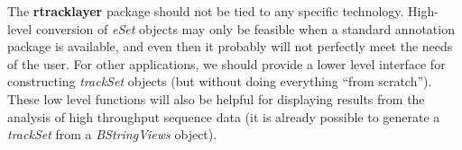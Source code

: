 \documentclass{article}
\begin{document}
The \textbf{rtracklayer} package should not be tied to any specific technology. High-level conversion of \textit{eSet} objects may only be feasible when a standard annotation package is available, and even then it probably will not perfectly meet the needs of the user. For other applications, we should provide a lower level interface for constructing \textit{trackSet} objects (but without doing everything ``from scratch''). These low level functions will also be helpful for displaying results from the analysis of high throughput sequence data (it is already possible to generate a \textit{trackSet} from a \textit{BStringViews} object).
\end{document}
